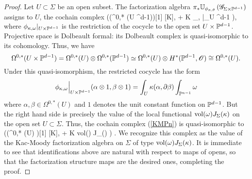 \begin{proof}
Let $U \subset \Sigma$ be an open subset. 
The factorization algebra $\pi_* \mathbb U_{\phi_{\kappa, \theta}} \left(\mathscr G_{\Sigma \times \mathbb P^{d-1}}\right)$ assigns to $U$, the cochain complex
\beqn\label{KMPn}
\left(\Sym \left(\Omega^{0,*} (U \times \PP^{d-1})\right)[1] [K], \dbar + K \phi_{\kappa, \omega}|_{U \times \PP^{d-1}} \right),
\eeqn
where $\phi_{\kappa, \omega}|_{U \times \mathbb P^{d-1}}$ is the restriction of the cocycle to the open set $U \times \mathbb P^{d-1}$. 
Projective space is Dolbeault formal: its Dolbeault complex is quasi-isomorphic to its cohomology.
Thus, we have 
\[
\Omega^{0,*} (U \times \mathbb P^{d-1}) = \Omega^{0,*}(U) \otimes \Omega^{0,*}(\mathbb P^{d-1}) \simeq \Omega^{0,*}(U) \otimes H^*(\mathbb P^{d-1}, \mathscr O) \cong \Omega^{0,*}(U) .
\]
Under this quasi-isomorphism, the restricted cocycle has the form
\[
\phi_{\kappa,\omega}\Big|_{U \times \mathbb P^{d-1}} (\alpha \otimes 1, \beta \otimes 1) = \int_{U} \kappa(\alpha, \partial \beta) \int_{\mathbb P^{n-1}} \omega 
\]
where $\alpha,\beta \in \Omega^{0,*} (U)$ and $1$ denotes the unit constant function on $\mathbb P^{d-1}$. 
But the right hand side is precisely the value of the local functional ${\rm vol}(\omega) J_\Sigma (\kappa)$ on the open set $U \subset \Sigma$. 
Thus, the cochain complex (\ref{KMPn}) is quasi-isomorphic to 
\beqn
\left(\Sym \left(\Omega^{0,*} (U) \right)[1] [K], \dbar + K {\rm vol}(\omega) J_\Sigma (\kappa) \right) .
\eeqn
We recognize this complex as the value of the Kac-Moody factorization algebra on $\Sigma$ of type ${\rm vol}(\omega) J_\Sigma (\kappa)$.
It is immediate to see that identifications above are natural with respect to maps of opens, so that the factorization structure maps are the desired ones,
completing the proof. 
\end{proof}

